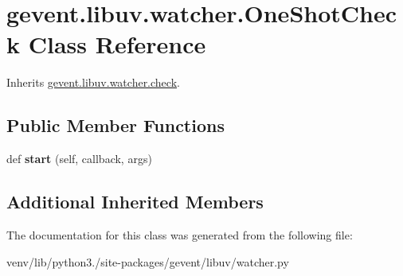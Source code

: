 \hypertarget{classgevent_1_1libuv_1_1watcher_1_1_one_shot_check}{}\section{gevent.\+libuv.\+watcher.\+One\+Shot\+Check Class Reference}
\label{classgevent_1_1libuv_1_1watcher_1_1_one_shot_check}


Inherits \hyperlink{classgevent_1_1libuv_1_1watcher_1_1check}{gevent.\+libuv.\+watcher.\+check}.

\subsection*{Public Member Functions}
\begin{DoxyCompactItemize}
\item 
\mbox{\label{classgevent_1_1libuv_1_1watcher_1_1_one_shot_check_a050058dc96e4ae7d948d11292cfb0241}} 
def {\bfseries start} (self, callback, args)
\end{DoxyCompactItemize}
\subsection*{Additional Inherited Members}


The documentation for this class was generated from the following file\+:\begin{DoxyCompactItemize}
\item 
venv/lib/python3./site-\/packages/gevent/libuv/watcher.\+py\end{DoxyCompactItemize}
